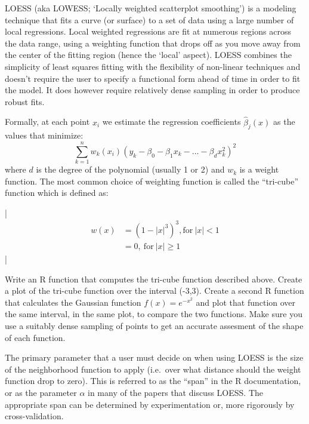 LOESS (aka LOWESS; `Locally weighted scatterplot smoothing') is a
modeling technique that fits a curve (or surface) to a set of data using
a large number of local regressions. Local weighted regressions are fit
at numerous regions across the data range, using a weighting function
that drops off as you move away from the center of the fitting region
(hence the `local' aspect). LOESS combines the simplicity of least
squares fitting with the flexibility of non-linear techniques and
doesn't require the user to specify a functional form ahead of time in
order to fit the model. It does however require relatively dense
sampling in order to produce robust fits.

Formally, at each point $x_i$ we estimate the regression coefficients
$\hat{\beta}_j(x)$ as the values that minimize:
\[\sum_{k=1}^n w_k(x_i)(y_k - \beta_0 - \beta_1 x_k - \ldots - \beta_d x_k^2)^2\]
where $d$ is the degree of the polynomial (usually 1 or 2) and $w_k$ is
a weight function. The most common choice of weighting function is
called the ``tri-cube'' function which is defined as:

\lstDeleteShortInline|
\begin{align*}
 w(x) & = (1-|x|^3)^3, \mbox{for}\ |x| < 1  \\
      & = 0,\ \mbox{for}\ |x| \geq 1
\end{align*}
\lstMakeShortInline|


\medskip
\begin{assignment}
Write an R function that computes the tri-cube
function described above. Create a plot of the tri-cube function over
the interval (-3,3). Create a second R function that calculates the
Gaussian function $f(x) = e^{-x^2}$ and plot that function over the same
interval, in the same plot, to compare the two functions.  Make sure you use a suitably dense sampling of points to get an accurate assesment of the shape of each function.
\end{assignment}

The primary parameter that a user must decide on when using LOESS is the
size of the neighborhood function to apply (i.e.~over what distance
should the weight function drop to zero). This is referred to as the
``span'' in the R documentation, or as the parameter $\alpha$ in many of
the papers that discuss LOESS. The appropriate span can be determined by
experimentation or, more rigorously by cross-validation.

